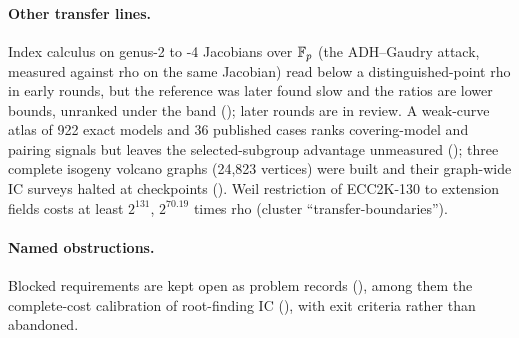\paragraph{Other transfer lines.} Index calculus on genus-2 to -4
Jacobians over $\mathbb{F}_p$ (the ADH--Gaudry attack, measured against rho on the
same Jacobian) read below a distinguished-point rho in early rounds, but the
reference was later found slow and the ratios are lower bounds, unranked
under the band ();
later rounds are in review. A weak-curve atlas of 922 exact models and 36
published cases ranks covering-model and pairing signals but leaves the
selected-subgroup advantage unmeasured
(); three complete isogeny
volcano graphs (24{,}823 vertices) were built and their graph-wide IC
surveys halted at checkpoints ().
Weil restriction of ECC2K-130 to extension fields costs at least $2^{131}$,
$2^{70.19}$ times rho (cluster ``transfer-boundaries'').

\paragraph{Named obstructions.} Blocked requirements are kept open as
problem records (), among them the complete-cost
calibration of root-finding IC
(), with exit
criteria rather than abandoned.
